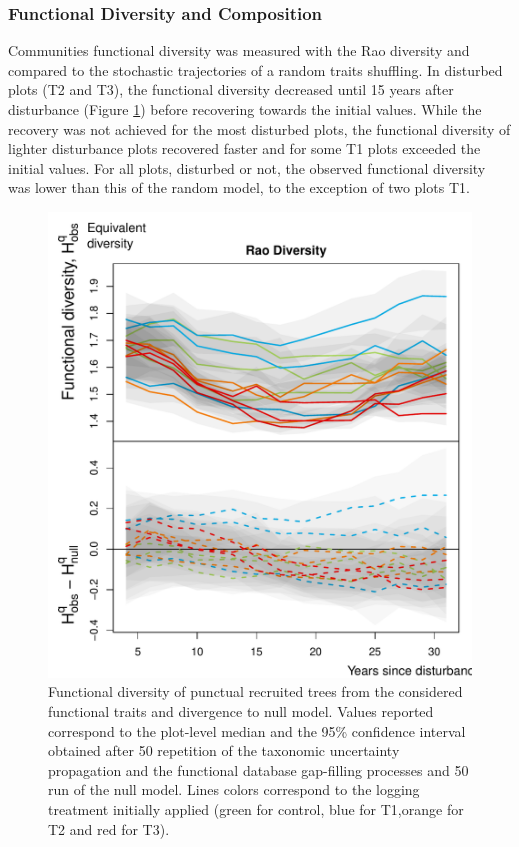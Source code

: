 \documentclass[fleqn,10pt]{ArtEcoFoG} %
\begin{document}
\subsubsection{Functional Diversity and
Composition}\label{functional-diversity-and-composition}

Communities functional diversity was measured with the Rao diversity and
compared to the stochastic trajectories of a random traits shuffling. In
disturbed plots (T2 and T3), the functional diversity decreased until 15
years after disturbance (Figure \ref{fig:FunTraj}) before recovering
towards the initial values. While the recovery was not achieved for the
most disturbed plots, the functional diversity of lighter disturbance
plots recovered faster and for some T1 plots exceeded the initial
values. For all plots, disturbed or not, the observed functional
diversity was lower than this of the random model, to the exception of
two plots T1.

\begin{figure}

{\centering \includegraphics{RecruitmentTrajectories_files/figure-latex/FunTraj-1} 

}

\caption{Functional diversity of punctual recruited trees from the considered functional traits and divergence to null model. Values reported correspond to the plot-level median and the 95\% confidence interval obtained after 50 repetition of the taxonomic uncertainty propagation and the functional database gap-filling processes and 50 run of the null model. Lines colors correspond to the logging treatment initially applied (green for control, blue for T1,orange for T2 and red for T3).}\label{fig:FunTraj}
\end{figure}
\end{document}
